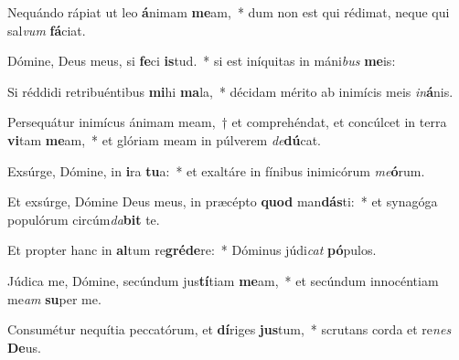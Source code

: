 \item Nequándo rápiat ut leo \textbf{á}nimam \textbf{me}am,~* dum non est qui rédimat, neque qui sal\textit{vum} \textbf{fá}ciat.
\item Dómine, Deus meus, si \textbf{fe}ci \textbf{is}tud.~* si est iníquitas in máni\textit{bus} \textbf{me}is:
\item Si réddidi retribuéntibus \textbf{mi}hi \textbf{ma}la,~* décidam mérito ab inimícis meis \textit{in}\textbf{á}nis.
\item Persequátur inimícus ánimam meam,~† et comprehéndat, et concúlcet in terra \textbf{vi}tam \textbf{me}am,~* et glóriam meam in púlverem \textit{de}\textbf{dú}cat.
\item Exsúrge, Dómine, in \textbf{i}ra \textbf{tu}a:~* et exaltáre in fínibus inimicórum \textit{me}\textbf{ó}rum.
\item Et exsúrge, Dómine Deus meus, in præcépto \textbf{quod} man\textbf{dás}ti:~* et synagóga populórum circúm\textit{da}\textbf{bit} te.
\item Et propter hanc in \textbf{al}tum re\textbf{gré}\textbf{de}re:~* Dóminus júdi\textit{cat} \textbf{pó}pulos.
\item Júdica me, Dómine, secúndum jus\textbf{tí}tiam \textbf{me}am,~* et secúndum innocéntiam me\textit{am} \textbf{su}per me.
\item Consumétur nequítia peccatórum, et \textbf{dí}riges \textbf{jus}tum,~* scrutans corda et re\textit{nes} \textbf{De}us.
